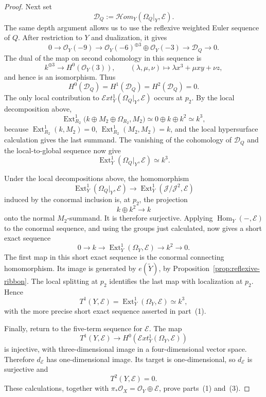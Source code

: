 \documentclass[11pt,twoside]{amsart}
\theoremstyle{plain}
\numberwithin{equation}{section}
\theoremstyle{definition}
\newcommand{\Ext}{\operatorname{Ext}}
\newcommand{\Hom}{\operatorname{Hom}}
\begin{document}
\begin{proof}
Next set
$$
\mathcal D_Q:=
\mathcal H om_Y(\Omega_Q|_Y,\mathcal E).
$$
The same depth argument allows us to use the reflexive weighted Euler
sequence of $Q$. After restriction to $Y$ and dualization, it gives
$$
0\longrightarrow\mathcal O_Y(-9)
\longrightarrow
\mathcal O_Y(-6)^{\oplus3}\oplus\mathcal O_Y(-3)
\longrightarrow\mathcal D_Q
\longrightarrow0.
$$
The dual of the map on second cohomology in this sequence is
$$
k^{\oplus3}
\longrightarrow H^0(\mathcal O_Y(3)),
\qquad
(\lambda,\mu,\nu)\longmapsto
\lambda x^3+\mu xy+\nu z,
$$
and hence is an isomorphism. Thus
$$
H^0(\mathcal D_Q)
=H^1(\mathcal D_Q)
=H^2(\mathcal D_Q)
=0.
$$
The only local contribution to
$\mathcal E xt^1_Y(\Omega_Q|_Y,\mathcal E)$ occurs at $p_2$. By the
local decomposition above,
$$
\Ext^1_{R_2}
\bigl(k\oplus M_2\oplus\Omega_{R_2},M_2\bigr)
\simeq
0\oplus k\oplus k^2
\simeq k^3,
$$
because $\Ext^1_{R_2}(k,M_2)=0$,
$\Ext^1_{R_2}(M_2,M_2)=k$, and the local hypersurface calculation gives
the last summand. The vanishing of the cohomology of $\mathcal D_Q$ and
the local-to-global sequence now give
$$
\Ext^1_Y(\Omega_Q|_Y,\mathcal E)\simeq k^3.
$$

Under the local decompositions above, the homomorphism
$$
\Ext^1_Y(\Omega_Q|_Y,\mathcal E)
\longrightarrow
\Ext^1_Y(\mathcal J/\mathcal J^2,\mathcal E)
$$
induced by the conormal inclusion is, at $p_2$, the projection
$$
k\oplus k^2\longrightarrow k
$$
onto the normal $M_2$-summand. It is therefore surjective. Applying
$\Hom_Y(-,\mathcal E)$ to the conormal sequence, and using the groups
just calculated, now gives a short exact sequence
$$
0\longrightarrow k
\longrightarrow
\Ext^1_Y(\Omega_Y,\mathcal E)
\longrightarrow k^2
\longrightarrow0.
$$
The first map in this short exact sequence is the conormal connecting
homomorphism. Its image is generated by $e(\widetilde Y)$, by
Proposition~\ref{prop:reflexive-ribbon}. The local splitting at $p_2$
identifies the last map with localization at $p_2$. Hence
$$
T^1(Y,\mathcal E)
=\Ext^1_Y(\Omega_Y,\mathcal E)
\simeq k^3,
$$
with the more precise short exact sequence asserted in part~\textup{(1)}.

Finally, return to the five-term sequence for $\mathcal E$. The map
$$
T^1(Y,\mathcal E)
\longrightarrow
H^0\!\left(
\mathcal E xt^1_Y(\Omega_Y,\mathcal E)
\right)
$$
is injective, with three-dimensional image in a four-dimensional vector
space. Therefore $d_{\mathcal E}$ has one-dimensional image. Its target
is one-dimensional, so $d_{\mathcal E}$ is surjective and
$$
T^2(Y,\mathcal E)=0.
$$
These calculations, together with
$\pi_*\mathcal O_X=\mathcal O_Y\oplus\mathcal E$, prove
parts~\textup{(1)} and~\textup{(3)}.


\end{proof}
\end{document}
